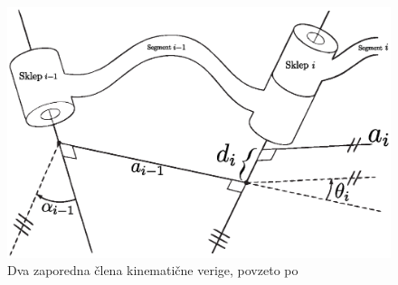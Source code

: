 \begin{figure}
	\centering
	\includegraphics[width=\textwidth, scale=0.75]{./Slike/d-h_drawing.eps}
	\caption{Dva zaporedna \v{c}lena kinemati\v{c}ne verige, povzeto po \cite{siciliano_robot}}
	\label{fig:d-h_drawing}
\end{figure}
